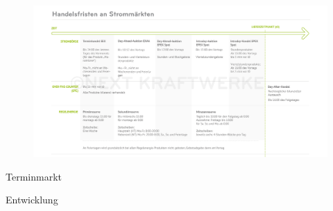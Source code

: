 \documentclass[aspectratio=1610, professionalfonts, 9pt]{beamer}
\begin{document}
{
\begin{frame}
  \begin{figure}
  \includegraphics[width=1.1\textwidth]{images/stromprodukte.jpg}
\end{figure}
\end{frame}
}


\begin{frame}{Terminmarkt}

\end{frame}

\begin{frame}{Entwicklung}

\end{frame}
\end{document}
